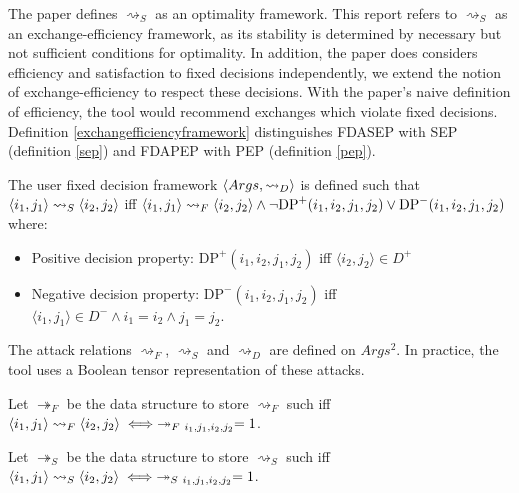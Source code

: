 The paper \cite{aes} defines $\rightsquigarrow_S$ as an optimality framework. This report refers to $\rightsquigarrow_S$ as an exchange-efficiency framework, as its stability is determined by necessary but not sufficient conditions for optimality. In addition, the paper does considers efficiency and satisfaction to fixed decisions independently, we extend the notion of exchange-efficiency to respect these decisions. With the paper's naive definition of efficiency, the tool would recommend exchanges which violate fixed decisions. Definition \ref{exchangefficiencyframework} distinguishes FDASEP with SEP (definition \ref{sep}) and FDAPEP with PEP (definition \ref{pep}).

\begin{definition}
	\label{fixeddecisionframework}
	
	The user fixed decision framework $\langle{Args},{\rightsquigarrow_D}\rangle$ is defined such that $\langle{i_1},{j_1}\rangle\rightsquigarrow_S\langle{ i_2},{j_2}\rangle$ iff $\langle{i_1},{j_1}\rangle\rightsquigarrow_F\langle{i_2},{j_2}\rangle\land\neg\text{DP}^+(i_1,i_2,j_1,j_2)\lor\text{DP}^-(i_1,i_2,j_1,j_2)$ where:
	\begin{itemize}
		\item Positive decision property: $\text{DP}^+(i_1,i_2,j_1,j_2)$ iff $\langle i_2, j_2\rangle\in D^+$
		\item Negative decision property: $\text{DP}^-(i_1,i_2,j_1,j_2)$ iff $\langle i_1, j_1\rangle\in D^-\land i_1=i_2\land j_1=j_2$.
	\end{itemize}
\end{definition}

The attack relations $\rightsquigarrow_F$, $\rightsquigarrow_S$ and $\rightsquigarrow_D$ are defined on $Args^2$. In practice, the tool uses a Boolean tensor representation of these attacks.

\begin{definition}
	\label{tensorfeasiblityframework}
	
	Let $\twoheadrightarrow_F$ be the data structure to store $\rightsquigarrow_F$ such iff $\pair{i_1}{j_1}\rightsquigarrow_F\pair{i_2}{j_2}\iff\twoheadrightarrow_{F\ i_1,j_1,i_2,j_2}=1$.
\end{definition}

\begin{definition}
	\label{tensorefficiencyframework}
	
	Let $\twoheadrightarrow_S$ be the data structure to store $\rightsquigarrow_S$ such iff $\pair{i_1}{j_1}\rightsquigarrow_S\pair{i_2}{j_2}\iff\twoheadrightarrow_{S\ i_1,j_1,i_2,j_2}=1$.
\end{definition}

